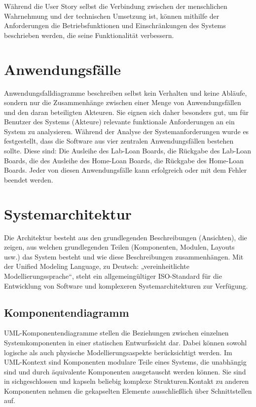 Während die User Story selbst die Verbindung zwischen der menschlichen Wahrnehmung und der technischen Umsetzung ist, können mithilfe der Anforderungen die Betriebsfunktionen und Einschränkungen des Systems beschrieben werden, die seine Funktionalität verbessern.

\section{Anwendungsfälle}
\label{sec:design:use_cases}
Anwendungsfalldiagramme beschreiben selbst kein Verhalten und keine Abläufe, sondern nur die Zusammenhänge zwischen einer Menge von Anwendungsfällen und den daran beteiligten Akteuren. Sie eignen sich daher besonders gut, um für Benutzer des Systems (Akteure) relevante funktionale Anforderungen an ein System zu analysieren\cite{website:21}. Während der Analyse der Systemanforderungen wurde es festgestellt, dass die Software aus vier zentralen Anwendungsfällen bestehen sollte. Diese sind: Die Ausleihe des Lab-Loan Boards, die Rückgabe des Lab-Loan Boards, die des Ausleihe des Home-Loan Boards, die Rückgabe des Home-Loan Boards. Jeder von diesen Anwendungsfälle kann erfolgreich oder mit dem Fehler beendet werden.

\section{Systemarchitektur}
\label{sec:design:uml}
Die Architektur besteht aus den grundlegenden Beschreibungen (Ansichten),  die zeigen, aus welchen grundlegenden Teilen (Komponenten, Modulen, Layouts usw.) das System besteht und wie diese Beschreibungen zusammenhängen. Mit der Unified Modeling Language, zu Deutsch: „vereinheitlichte Modellierungssprache“, steht ein allgemeingültiger ISO-Standard für die Entwicklung von Software und komplexeren Systemarchitekturen zur Verfügung\cite{website:20}.

\subsection{Komponentendiagramm}
\label{sec:design:uml:uml_component}
UML-Komponentendiagramme stellen die Beziehungen zwischen einzelnen Systemkomponenten in einer statischen Entwurfssicht dar. Dabei können sowohl logische als auch physische Modellierungsaspekte berücksichtigt werden. Im UML-Kontext sind Komponenten modulare Teile eines Systems, die unabhängig sind und durch äquivalente Komponenten ausgetauscht werden können. Sie sind in sichgeschlossen und kapseln beliebig komplexe Strukturen.Kontakt zu anderen Komponenten nehmen die gekapselten Elemente ausschließlich über Schnittstellen auf\cite{website:20}.


